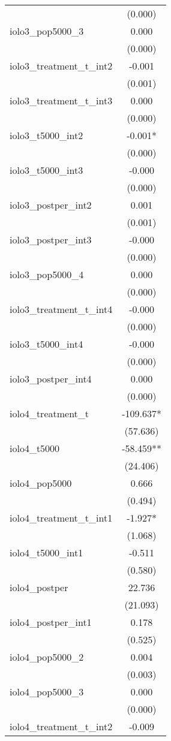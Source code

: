 \documentclass[]{article}
\begin{document}
\begin{tabular}{lc}
 & (0.000) \\
iolo3\_pop5000\_3 & 0.000 \\
 & (0.000) \\
iolo3\_treatment\_t\_int2 & -0.001 \\
 & (0.001) \\
iolo3\_treatment\_t\_int3 & 0.000 \\
 & (0.000) \\
iolo3\_t5000\_int2 & -0.001* \\
 & (0.000) \\
iolo3\_t5000\_int3 & -0.000 \\
 & (0.000) \\
iolo3\_postper\_int2 & 0.001 \\
 & (0.001) \\
iolo3\_postper\_int3 & -0.000 \\
 & (0.000) \\
iolo3\_pop5000\_4 & 0.000 \\
 & (0.000) \\
iolo3\_treatment\_t\_int4 & -0.000 \\
 & (0.000) \\
iolo3\_t5000\_int4 & -0.000 \\
 & (0.000) \\
iolo3\_postper\_int4 & 0.000 \\
 & (0.000) \\
iolo4\_treatment\_t & -109.637* \\
 & (57.636) \\
iolo4\_t5000 & -58.459** \\
 & (24.406) \\
iolo4\_pop5000 & 0.666 \\
 & (0.494) \\
iolo4\_treatment\_t\_int1 & -1.927* \\
 & (1.068) \\
iolo4\_t5000\_int1 & -0.511 \\
 & (0.580) \\
iolo4\_postper & 22.736 \\
 & (21.093) \\
iolo4\_postper\_int1 & 0.178 \\
 & (0.525) \\
iolo4\_pop5000\_2 & 0.004 \\
 & (0.003) \\
iolo4\_pop5000\_3 & 0.000 \\
 & (0.000) \\
iolo4\_treatment\_t\_int2 & -0.009 \\

\end{tabular}
\end{document}
